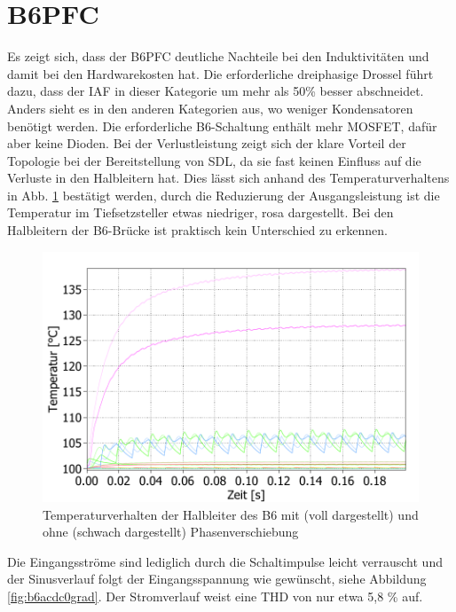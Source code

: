 \section{B6PFC}
	Es zeigt sich, dass der \gls{B6PFC} deutliche Nachteile bei den Induktivitäten und damit bei den Hardwarekosten hat. Die erforderliche dreiphasige Drossel führt dazu, dass der IAF in dieser Kategorie um mehr als 50\% besser abschneidet.
	Anders sieht es in den anderen Kategorien aus, wo weniger Kondensatoren benötigt werden. Die erforderliche B6-Schaltung enthält mehr \gls{MOSFET}, dafür aber keine Dioden. Bei der Verlustleistung zeigt sich der klare Vorteil der Topologie bei der Bereitstellung von \gls{SDL}, da sie fast keinen Einfluss auf die Verluste in den Halbleitern hat. Dies lässt sich anhand des Temperaturverhaltens in Abb. \ref{fig:b6temp030grad} bestätigt werden, durch die Reduzierung der Ausgangsleistung ist die Temperatur im Tiefsetzsteller etwas niedriger, rosa dargestellt. Bei den Halbleitern der B6-Brücke ist praktisch kein Unterschied zu erkennen.
	\begin{figure}
		\centering
		\includegraphics[width=0.9\linewidth]{content/Grafiken/B6_Temp_0&30Grad}
		\caption{Temperaturverhalten der Halbleiter des B6 mit (voll dargestellt) und ohne (schwach dargestellt) Phasenverschiebung}
		\label{fig:b6temp030grad}
	\end{figure}
	Die Eingangsströme sind lediglich durch die Schaltimpulse leicht verrauscht und der Sinusverlauf folgt der Eingangsspannung wie gewünscht, siehe Abbildung \ref{fig:b6acdc0grad}.  Der Stromverlauf weist eine THD von nur etwa 5,8 \% auf. 
	
